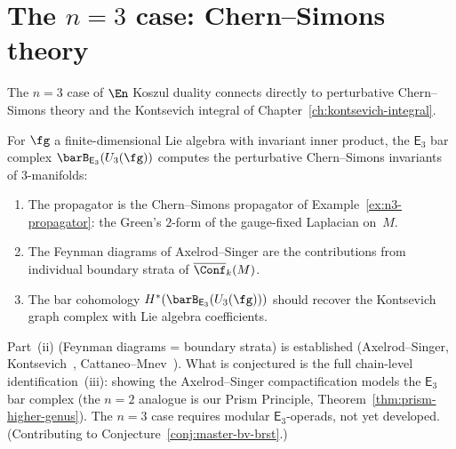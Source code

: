 
\section{\texorpdfstring{The $n = 3$ case: Chern--Simons theory}{The n = 3 case: Chern--Simons theory}}
\label{sec:n3-chern-simons}

The $n = 3$ case of $\En$ Koszul duality connects directly to
perturbative Chern--Simons theory and the Kontsevich integral
of Chapter~\ref{ch:kontsevich-integral}.

\begin{conjecture}
\label{conj:e3-chern-simons}
For $\fg$ a finite-dimensional Lie algebra with invariant inner
product, the $\mathsf{E}_3$ bar complex
$\barB_{\mathsf{E}_3}(U_3(\fg))$ computes the perturbative
Chern--Simons invariants of $3$-manifolds:
\begin{enumerate}[label=\textup{(\roman*)}]
\item The propagator is the Chern--Simons propagator of
 Example~\textup{\ref{ex:n3-propagator}}: the Green's $2$-form
 of the gauge-fixed Laplacian on~$M$.
\item The Feynman diagrams of Axelrod--Singer are the
 contributions from individual boundary strata of
 $\overline{\Conf}_k(M)$.
\item The bar cohomology
 $H^*(\barB_{\mathsf{E}_3}(U_3(\fg)))$
 should recover the Kontsevich graph complex with Lie algebra
 coefficients.
\end{enumerate}
\end{conjecture}

\begin{remark}[Scope]
\label{rem:e3-scope}
Part~(ii) (Feynman diagrams = boundary strata) is established
(Axelrod--Singer, Kontsevich~\cite{Kon94}, Cattaneo--Mnev~\cite{CattaneoMnev10}).
What is conjectured is the full chain-level identification~(iii):
showing the Axelrod--Singer compactification models the
$\mathsf{E}_3$ bar complex (the $n = 2$ analogue is our
Prism Principle, Theorem~\ref{thm:prism-higher-genus}).
The $n = 3$ case requires modular $\mathsf{E}_3$-operads, not yet
developed. (Contributing to Conjecture~\ref{conj:master-bv-brst}.)
\end{remark}


